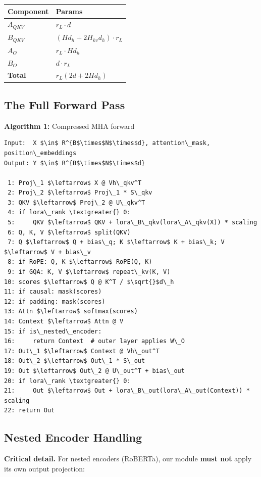 \begin{table}[H]
\centering
\small
\begin{tabular}{ll}
\toprule
\textbf{Component} & \textbf{Params} \\
\midrule
$A_{QKV}$ & $r_L \cdot d$ \\
$B_{QKV}$ & $(H d_h + 2 H_{kv} d_h) \cdot r_L$ \\
$A_O$ & $r_L \cdot H d_h$ \\
$B_O$ & $d \cdot r_L$ \\
\textbf{Total} & $r_L (2d + 2 H d_h)$ \\
\bottomrule
\end{tabular}
\end{table}

\subsection{The Full Forward Pass}

\textbf{Algorithm 1:} Compressed MHA forward
\begin{lstlisting}
Input:  X $\in$ R^{B$\times$N$\times$d}, attention\_mask, position\_embeddings
Output: Y $\in$ R^{B$\times$N$\times$d}

 1: Proj\_1 $\leftarrow$ X @ Vh\_qkv^T
 2: Proj\_2 $\leftarrow$ Proj\_1 * S\_qkv
 3: QKV $\leftarrow$ Proj\_2 @ U\_qkv^T
 4: if lora\_rank \textgreater{} 0:
 5:     QKV $\leftarrow$ QKV + lora\_B\_qkv(lora\_A\_qkv(X)) * scaling
 6: Q, K, V $\leftarrow$ split(QKV)
 7: Q $\leftarrow$ Q + bias\_q; K $\leftarrow$ K + bias\_k; V $\leftarrow$ V + bias\_v
 8: if RoPE: Q, K $\leftarrow$ RoPE(Q, K)
 9: if GQA: K, V $\leftarrow$ repeat\_kv(K, V)
10: scores $\leftarrow$ Q @ K^T / $\sqrt{}$d\_h
11: if causal: mask(scores)
12: if padding: mask(scores)
13: Attn $\leftarrow$ softmax(scores)
14: Context $\leftarrow$ Attn @ V
15: if is\_nested\_encoder:
16:     return Context  # outer layer applies W\_O
17: Out\_1 $\leftarrow$ Context @ Vh\_out^T
18: Out\_2 $\leftarrow$ Out\_1 * S\_out
19: Out $\leftarrow$ Out\_2 @ U\_out^T + bias\_out
20: if lora\_rank \textgreater{} 0:
21:     Out $\leftarrow$ Out + lora\_B\_out(lora\_A\_out(Context)) * scaling
22: return Out
\end{lstlisting}

\subsection{Nested Encoder Handling}

\textbf{Critical detail.} For nested encoders (RoBERTa), our module \textbf{must not} 
apply its own output projection:

